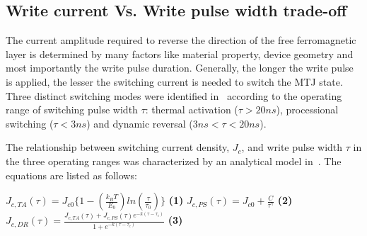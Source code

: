 \subsection{Write current Vs. Write pulse width trade-off} \label{subsec:ict}


The current amplitude required to reverse the direction of the free ferromagnetic layer is determined
by many factors like material property, device geometry and most importantly the write pulse
duration. Generally, the longer the write pulse is applied, the lesser the switching current is
needed to switch the MTJ state. Three distinct switching modes were identified in~\cite{STTRAM:JAP07}
according to the operating range of switching pulse width $\tau$: thermal activation ($\tau>20ns$),
processional switching ($\tau<3ns$) and dynamic reversal ($3ns<\tau<20ns$).

The relationship between switching current density, $J_{c}$, and write pulse width $\tau$ in the
three operating ranges was characterized by an analytical model in~\cite{STTRAM:IEDM09}. The
equations are listed as follows:

 {
 \small{
\noindent $J_{c,TA}(\tau) = J_{c0}\{1- (\frac{k_{B}T}{E_{b}})ln(\frac{\tau}{\tau_{0}})\}$
\hspace{1mm} \textbf{(1)} \hspace{1mm} $J_{c,PS}(\tau) = J_{c0}+ \frac{C}{\tau^{\gamma}}$
\hspace{1mm} \textbf{(2)} \hspace{1mm} $J_{c,DR}(\tau) =
\frac{J_{c,TA}(\tau)+J_{c,PS}(\tau)e^{-k(\tau - \tau_{c})}}{1+e^{-k(\tau - \tau_{c})}}$ \hspace{1mm}
\textbf{(3)}
 }
 }

